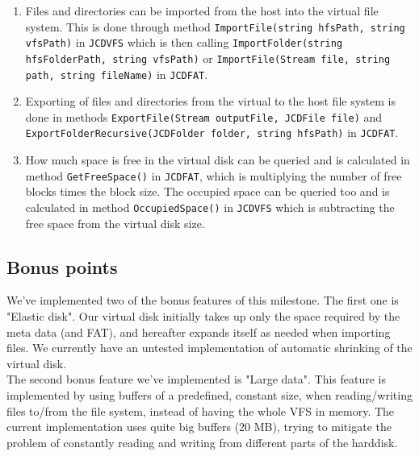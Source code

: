 \documentclass[11pt]{article}
\begin{document}
\begin{enumerate}
	\item Files and directories can be imported from the host into the virtual file system. This is done through method \texttt{ImportFile(string hfsPath, string vfsPath)} in \texttt{JCDVFS} which is then calling \texttt{ImportFolder(string hfsFolderPath, string vfsPath)} or \texttt{ImportFile(Stream file, string path, string fileName)} in \texttt{JCDFAT}.
	\item Exporting of files and directories from the virtual to the host file system is done in methods \texttt{ExportFile(Stream outputFile, JCDFile file)} and \texttt{ExportFolderRecursive(JCDFolder folder, string hfsPath)} in \texttt{JCDFAT}.
	\item How much space is free in the virtual disk can be queried and is calculated in method \texttt{GetFreeSpace()} in \texttt{JCDFAT}, which is multiplying the number of free blocks times the block size. The occupied space can be queried too and is calculated in method \texttt{OccupiedSpace()} in \texttt{JCDVFS} which is subtracting the free space from the virtual disk size.
\end{enumerate}

\subsection{Bonus points}
We've implemented two of the bonus features of this milestone. The first one is "Elastic disk". Our virtual disk initially takes up only the space required by the meta data (and FAT), and hereafter expands itself as needed when importing files. We currently have an untested implementation of automatic shrinking of the virtual disk.\\
The second bonus feature we've implemented is "Large data". This feature is implemented by using buffers of a predefined, constant size, when reading/writing files to/from the file system, instead of having the whole VFS in memory. The current implementation uses quite big buffers (20 MB), trying to mitigate the problem of constantly reading and writing from different parts of the harddisk.
\end{document}
